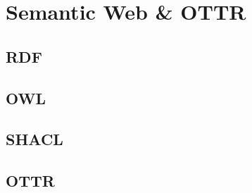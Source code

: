 
\chapter{Semantic Web \& OTTR}

\section{RDF}
\label{rdf}

\section{OWL}

\section{SHACL}

\section{OTTR}
\label{OTTR}